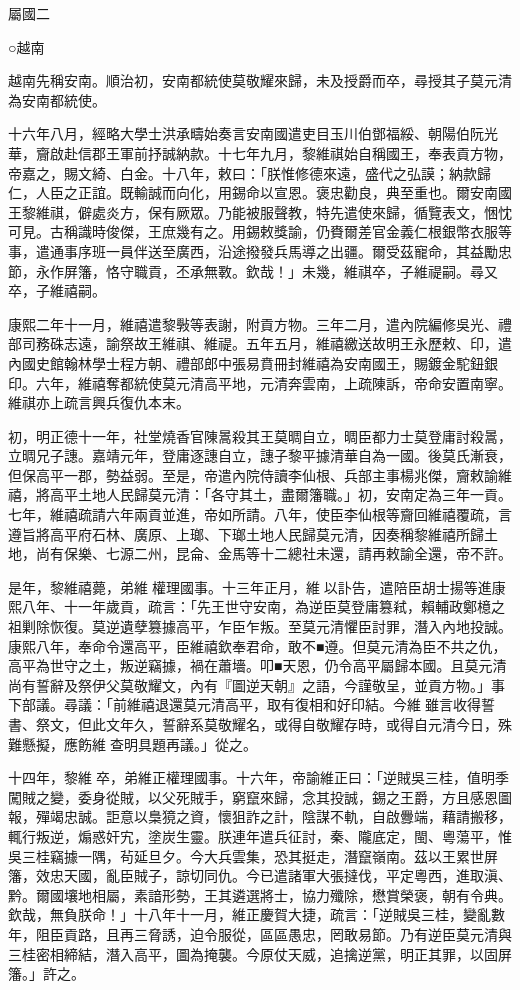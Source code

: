 
\begin{pinyinscope}
屬國二

○越南

越南先稱安南。順治初，安南都統使莫敬耀來歸，未及授爵而卒，尋授其子莫元清為安南都統使。

十六年八月，經略大學士洪承疇始奏言安南國遣吏目玉川伯鄧福綏、朝陽伯阮光華，齎啟赴信郡王軍前抒誠納款。十七年九月，黎維祺始自稱國王，奉表貢方物，帝嘉之，賜文綺、白金。十八年，敕曰：「朕惟修德來遠，盛代之弘謨；納款歸仁，人臣之正誼。既輸誠而向化，用錫命以宣恩。褒忠勸良，典至重也。爾安南國王黎維祺，僻處炎方，保有厥眾。乃能被服聲教，特先遣使來歸，循覽表文，悃忱可見。古稱識時俊傑，王庶幾有之。用錫敕獎諭，仍賚爾差官金義仁根銀幣衣服等事，遣通事序班一員伴送至廣西，沿途撥發兵馬導之出疆。爾受茲寵命，其益勵忠節，永作屏籓，恪守職貢，丕承無斁。欽哉！」未幾，維祺卒，子維禔嗣。尋又卒，子維禧嗣。

康熙二年十一月，維禧遣黎斅等表謝，附貢方物。三年二月，遣內院編修吳光、禮部司務硃志遠，諭祭故王維祺、維禔。五年五月，維禧繳送故明王永歷敕、印，遣內國史館翰林學士程方朝、禮部郎中張易賁冊封維禧為安南國王，賜鍍金駝鈕銀印。六年，維禧奪都統使莫元清高平地，元清奔雲南，上疏陳訴，帝命安置南寧。維祺亦上疏言興兵復仇本末。

初，明正德十一年，社堂燒香官陳暠殺其王莫晭自立，晭臣都力士莫登庸討殺暠，立晭兄子譓。嘉靖元年，登庸逐譓自立，譓子黎平據清華自為一國。後莫氏漸衰，但保高平一郡，勢益弱。至是，帝遣內院侍讀李仙根、兵部主事楊兆傑，齎敕諭維禧，將高平土地人民歸莫元清：「各守其土，盡爾籓職。」初，安南定為三年一貢。七年，維禧疏請六年兩貢並進，帝如所請。八年，使臣李仙根等齎回維禧覆疏，言遵旨將高平府石林、廣原、上瑯、下瑯土地人民歸莫元清，因奏稱黎維禧所歸土地，尚有保樂、七源二州，昆侖、金馬等十二總社未還，請再敕諭全還，帝不許。

是年，黎維禧薨，弟維權理國事。十三年正月，維以訃告，遣陪臣胡士揚等進康熙八年、十一年歲貢，疏言：「先王世守安南，為逆臣莫登庸篡弒，賴輔政鄭檍之祖剿除恢復。莫逆遺孽篡據高平，乍臣乍叛。至莫元清懼臣討罪，潛入內地投誠。康熙八年，奉命令還高平，臣維禧欽奉君命，敢不■遵。但莫元清為臣不共之仇，高平為世守之土，叛逆竊據，禍在蕭墻。叩■天恩，仍令高平屬歸本國。且莫元清尚有誓辭及祭伊父莫敬耀文，內有『圖逆天朝』之語，今謹敬呈，並貢方物。」事下部議。尋議：「前維禧退還莫元清高平，取有復相和好印結。今維雖言收得誓書、祭文，但此文年久，誓辭系莫敬耀名，或得自敬耀存時，或得自元清今日，殊難懸擬，應飭維查明具題再議。」從之。

十四年，黎維卒，弟維正權理國事。十六年，帝諭維正曰：「逆賊吳三桂，值明季闖賊之變，委身從賊，以父死賊手，窮竄來歸，念其投誠，錫之王爵，方且感恩圖報，殫竭忠誠。詎意以梟獍之資，懷狙詐之計，陰謀不軌，自啟釁端，藉請搬移，輒行叛逆，煽惑奸宄，塗炭生靈。朕連年遣兵征討，秦、隴底定，閩、粵蕩平，惟吳三桂竊據一隅，茍延旦夕。今大兵雲集，恐其挺走，潛竄嶺南。茲以王累世屏籓，效忠天國，亂臣賊子，諒切同仇。今已遣諸軍大張撻伐，平定粵西，進取滇、黔。爾國壤地相屬，素諳形勢，王其遴選將士，協力殲除，懋賞榮褒，朝有令典。欽哉，無負朕命！」十八年十一月，維正慶賀大捷，疏言：「逆賊吳三桂，變亂數年，阻臣貢路，且再三脅誘，迫令服從，區區愚忠，罔敢易節。乃有逆臣莫元清與三桂密相締結，潛入高平，圖為掩襲。今原仗天威，追擒逆黨，明正其罪，以固屏籓。」許之。


\end{pinyinscope}

